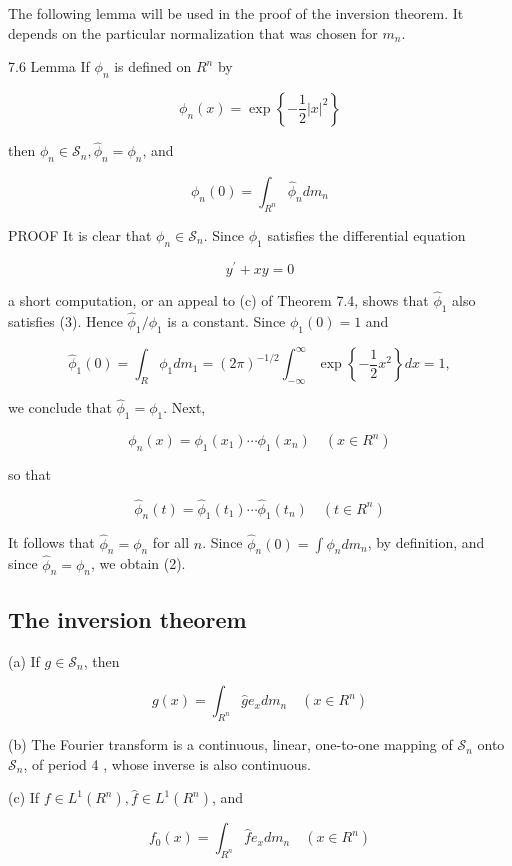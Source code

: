 \documentclass[10pt]{article}
\begin{document}
The following lemma will be used in the proof of the inversion theorem. It depends on the particular normalization that was chosen for $m_{n}$.

7.6 Lemma If $\phi_{n}$ is defined on $R^{n}$ by

$$
\phi_{n}(x)=\exp \left\{-\frac{1}{2}|x|^{2}\right\}
$$

then $\phi_{n} \in \mathscr{S}_{n}, \hat{\phi}_{n}=\phi_{n}$, and

$$
\phi_{n}(0)=\int_{R^{n}} \hat{\phi}_{n} d m_{n}
$$

PROOF It is clear that $\phi_{n} \in \mathscr{S}_{n}$. Since $\phi_{1}$ satisfies the differential equation

$$
y^{\prime}+x y=0
$$

a short computation, or an appeal to (c) of Theorem 7.4, shows that $\hat{\phi}_{1}$ also satisfies (3). Hence $\hat{\phi}_{1} / \phi_{1}$ is a constant. Since $\phi_{1}(0)=1$ and

$$
\hat{\phi}_{1}(0)=\int_{R} \phi_{1} d m_{1}=(2 \pi)^{-1 / 2} \int_{-\infty}^{\infty} \exp \left\{-\frac{1}{2} x^{2}\right\} d x=1,
$$

we conclude that $\hat{\phi}_{1}=\phi_{1}$. Next,

$$
\phi_{n}(x)=\phi_{1}\left(x_{1}\right) \cdots \phi_{1}\left(x_{n}\right) \quad\left(x \in R^{n}\right)
$$

so that

$$
\hat{\phi}_{n}(t)=\hat{\phi}_{1}\left(t_{1}\right) \cdots \hat{\phi}_{1}\left(t_{n}\right) \quad\left(t \in R^{n}\right)
$$

It follows that $\hat{\phi}_{n}=\phi_{n}$ for all $n$. Since $\hat{\phi}_{n}(0)=\int \phi_{n} d m_{n}$, by definition, and since $\hat{\phi}_{n}=\phi_{n}$, we obtain (2).

\subsection{The inversion theorem}
(a) If $g \in \mathscr{S}_{n}$, then

$$
g(x)=\int_{R^{n}} \hat{g} e_{x} d m_{n} \quad\left(x \in R^{n}\right)
$$

(b) The Fourier transform is a continuous, linear, one-to-one mapping of $\mathscr{S}_{n}$ onto $\mathscr{S}_{n}$, of period 4 , whose inverse is also continuous.

(c) If $f \in L^{1}\left(R^{n}\right), \hat{f} \in L^{1}\left(R^{n}\right)$, and

$$
f_{0}(x)=\int_{R^{n}} \hat{f} e_{x} d m_{n} \quad\left(x \in R^{n}\right)
$$
\end{document}
